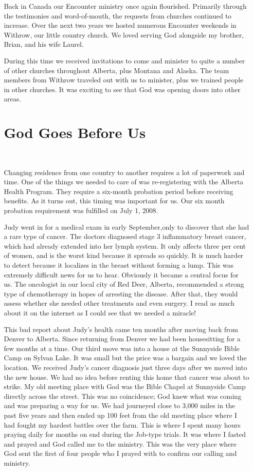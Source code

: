 \documentclass[twoside, 12pt]{book}
\begin{document}
Back in Canada our Encounter ministry once again flourished. Primarily through the testimonies and word-of-mouth, the requests from churches continued to increase. Over the next two years we hosted numerous Encounter weekends in Withrow, our little country church. We loved serving God alongside my brother, Brian, and his wife Laurel.

During this time we received invitations to come and minister to quite a number of other churches throughout Alberta, plus Montana and Alaska. The team members from Withrow traveled out with us to minister, plus we trained people in other churches. It was exciting to see that God was opening doors into other areas.


\section{God Goes Before Us}
\

Changing residence from one country to another requires a lot of paperwork and time. One of the things we needed to care of was re-registering with the Alberta Health Program. They require a six-month probation period before receiving benefits. As it turns out, this timing was important for us. Our six month probation requirement was fulfilled on July 1, 2008.

Judy went in for a medical exam in early September,only to discover that she had a rare type of cancer. The doctors diagnosed stage 3 inflammatory breast cancer, which had already extended into her lymph system. It only affects three per cent of women, and is the worst kind because it spreads so quickly. It is much harder to detect because it localizes in the breast without forming a lump. This was extremely difficult news for us to hear. Obviously it became a central focus for us. The oncologist in our local city of Red Deer, Alberta, recommended a strong type of chemotherapy in hopes of arresting the disease. After that, they would assess whether she needed other treatments and even surgery. I read as much about it on the internet as I could see that we needed a miracle!

This bad report about Judy’s health came ten months after moving back from Denver to Alberta. Since returning from Denver we had been housesitting for a few months at a time. Our third move was into a house at the Sunnyside Bible Camp on Sylvan Lake. It was small but the price was a bargain and we loved the location. We received Judy’s cancer diagnosis just three days after we moved into the new house. We had no idea before renting this home that cancer was about to strike. My old meeting place with God was the Bible Chapel at Sunnyside Camp directly across the street. This was no coincidence; God knew what was coming and was preparing a way for us. We had journeyed close to 3,000 miles in the past five years and then ended up 100 feet from the old meeting place where I had fought my hardest battles over the farm. This is where I spent many hours praying daily for months on end during the Job-type trials. It was where I fasted and prayed and God called me to the ministry. This was the very place where God sent the first of four people who I prayed with to confirm our calling and ministry.
\end{document}
